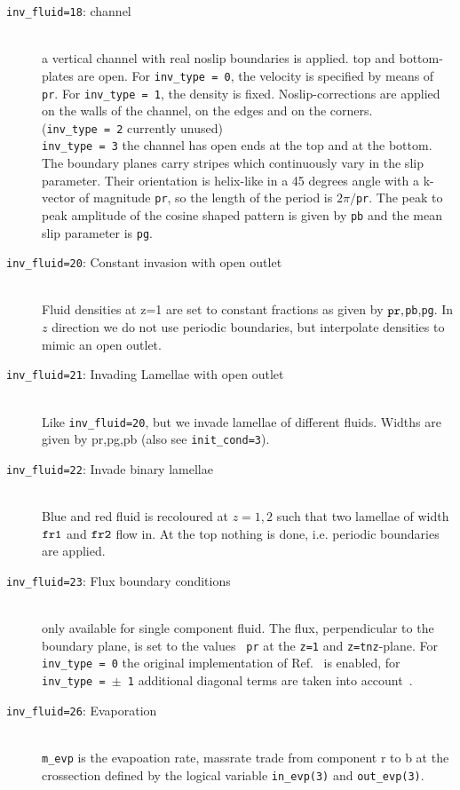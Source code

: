 \documentclass[a4paper]{article}
\begin{document}
\begin{description}
        \item[{\tt inv\_fluid=18}: channel]\ \\
                a vertical channel with real noslip boundaries is applied.
                top and bottom-plates are open. For {\tt inv\_type = 0}, the velocity
                is specified by means of {\tt pr}. For {\tt inv\_type = 1}, the density is fixed.
                Noslip-corrections are applied on the walls of the channel, on the
                edges and on the corners. \\
                ({\tt inv\_type = 2} currently unused)\\
                {\tt inv\_type = 3} the channel has open ends at the top and at the
                bottom. The boundary planes carry stripes which continuously 
                vary in the slip parameter. Their orientation is helix-like in a
                45 degrees angle with a k-vector of magnitude {\tt pr}, so the 
                length of the period is $2 \pi /${\tt pr}. The peak to peak amplitude
                of the cosine shaped pattern is given by {\tt pb} and the mean slip
                parameter is {\tt pg}.
	\item[{\tt inv\_fluid=20}: Constant invasion with open outlet]\ \\
		Fluid densities at z=1 are set to constant fractions as
		given by ${\tt pr},${\tt pb},{\tt pg}. In $z$ direction we
		do not use periodic boundaries, but interpolate densities 
		to mimic an open outlet.
	\item[{\tt inv\_fluid=21}: Invading Lamellae with open outlet]\ \\
		Like {\tt inv\_fluid=20}, but we invade lamellae of
		different fluids. Widths are given by pr,pg,pb (also see 
		{\tt init\_cond=3}).
	\item[{\tt inv\_fluid=22}: Invade binary lamellae]\ \\
		Blue and red fluid is recoloured at $z=1,2$ such that two
                lamellae of width ${\tt fr1}$ and ${\tt fr2}$ flow in. At the 
                top nothing is done, i.e. periodic boundaries are applied.
              \item[{\tt inv\_fluid=23}: Flux boundary conditions]\ \\
                only available for single component fluid. The flux,
                perpendicular to the boundary plane, is set to the values {\tt
                  pr} at the {\tt z=1} and {\tt z=tnz}-plane. For {\tt
                  inv\_type = 0} the original implementation of
                Ref.~\cite{bib:kutay} is enabled, for {\tt inv\_type = $\pm$
                  1} additional diagonal terms are taken into
                account~\cite{bib:hecht08}.
	\item[{\tt inv\_fluid=26}: Evaporation]\ \\
                {\tt m\_evp} is the evapoation rate, massrate trade from
                component r to b at the crossection defined by the logical
                variable {\tt in\_evp(3)} and {\tt out\_evp(3)}.
\end{description}
\end{document}
